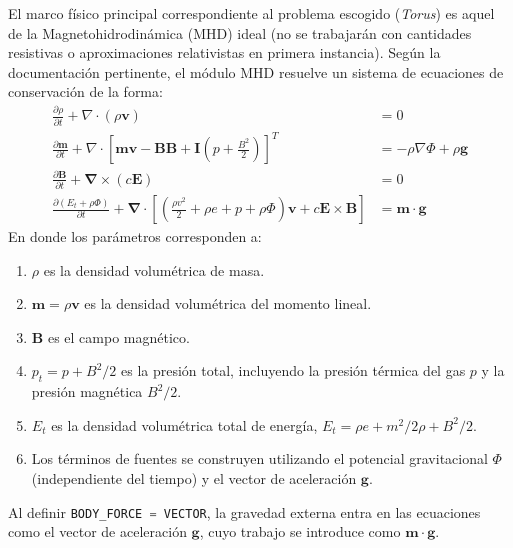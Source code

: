 \documentclass[11pt, letterpaper]{article}
\begin{document}
El marco físico principal correspondiente al problema escogido (\textit{Torus}) es aquel de la Magnetohidrodinámica (MHD) ideal (no se trabajarán con cantidades resistivas o aproximaciones relativistas en primera instancia). Según la documentación pertinente\cite{plutomanual}, el módulo MHD resuelve un sistema de ecuaciones de conservación de la forma:
\begin{subequations}\label{eq:MHD}
    \begin{align}
        \frac{\partial \rho}{\partial t} + \nabla \cdot (\rho \mathbf{v}) &= 0 \\[5pt]
        \frac{\partial \mathbf{m}}{\partial t} + \nabla \cdot \left[ \mathbf{m}\mathbf{v} - \mathbf{BB} + \mathbf{I} \left(p + \frac{B^2}{2}\right) \right]^T &= -\rho \nabla \Phi + \rho \mathbf{g} \\[5pt]
        \frac{\partial \mathbf{B}}{\partial t} + \mathbf{\nabla} \times (c\mathbf{E}) &= 0 \\[5pt]
        \frac{\partial (E_t + \rho \Phi)}{\partial t} + \mathbf{\nabla} \cdot \left[\left(   \frac{\rho v^2}{2} + \rho e + p + \rho \Phi\right)\mathbf{v} + c\mathbf{E} \times \mathbf{B}\right] &= \mathbf{m} \cdot \mathbf{g} 
    \end{align}    
\end{subequations}
En donde los parámetros corresponden a:
\begin{enumerate}
    \item $\rho$ es la densidad volumétrica de masa.
    \item $\mathbf{m} = \rho \mathbf{v}$ es la densidad volumétrica del momento lineal.
    \item $\mathbf{B}$ es el campo magnético.
    \item $p_t = p + B^2/2$ es la presión total, incluyendo la presión térmica del gas $p$ y la presión magnética $B^2/2$.
    \item $E_t$ es la densidad volumétrica total de energía, $E_t = \rho e + m^2/2\rho + B^2/2$.
    \item Los términos de fuentes se construyen utilizando el potencial gravitacional $\Phi$ (independiente del tiempo) y el vector de aceleración $\mathbf{g}$.
\end{enumerate}
Al definir \lstinline[language=C]{BODY_FORCE = VECTOR}, la gravedad externa entra en las ecuaciones como el vector de aceleración $\mathbf{g}$, cuyo trabajo se introduce como $\mathbf{m \cdot g}$.

\medskip
\end{document}
